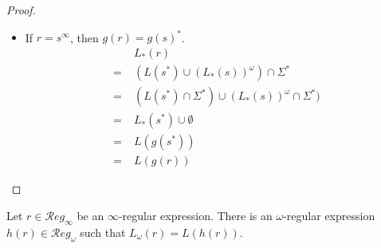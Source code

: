 \begin{proof}
\begin{itemize}
		\item If $r = s^\infty$, then $g(r) = g(s)^*$.
		\begin{align*}
			& L_*(r) \\
			=\;& (L(s^*) \cup (L_*(s))^\omega) \cap \Sigma^* \\
			=\;& (L(s^*) \cap \Sigma^*) \cup (L_*(s))^\omega \cap \Sigma^*) \\
			=\;& L_*(s^*) \cup \emptyset \\
			=\;& L(g(s^*)) \\
			=\;& L(g(r))
		\end{align*}
	\end{itemize}
\end{proof}


\begin{lem}
	Let $r \in \mathcal{R}eg_\infty$ be an $\infty$-regular expression. There is an $\omega$-regular expression $h(r) \in \mathcal{R}eg_\omega$ such that $L_\omega(r) = L(h(r))$.
	\label{lem:infty_regexp_to_omega_regexp}
\end{lem}

